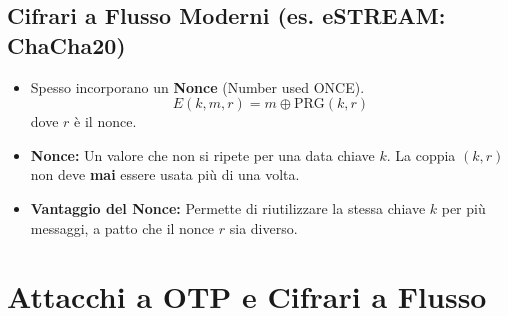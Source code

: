 \subsection{Cifrari a Flusso Moderni (es. eSTREAM: ChaCha20)}
\begin{itemize}
    \item Spesso incorporano un \textbf{Nonce} (Number used ONCE).
    \[ E(k, m, r) = m \oplus \text{PRG}(k, r) \]
    dove $r$ è il nonce.
    \item \textbf{Nonce:} Un valore che non si ripete per una data chiave $k$. La coppia $(k, r)$ non deve \textbf{mai} essere usata più di una volta.
    \item \textbf{Vantaggio del Nonce:} Permette di riutilizzare la stessa chiave $k$ per più messaggi, a patto che il nonce $r$ sia diverso.
\end{itemize}

\section{Attacchi a OTP e Cifrari a Flusso}

